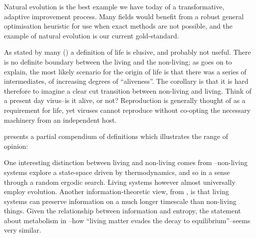 Natural evolution is the best example we have today of a transformative, adaptive improvement process. Many fields would benefit from a robust general optimisation heuristic for use when exact methods are not possible, and the example of natural evolution is our current gold-standard. 

As stated by many (\eg \cite{Pascal2013, Malaterre2015}) a definition of life is elusive, and probably not useful. There is no definite boundary between the living and the non-living; as \parencite{Pascal2013} goes on to explain, the most likely scenario for the origin of life is that there was a series of intermediates, of increasing degrees of ``aliveness''. The corollary is that it is hard therefore to imagine a clear cut transition between non-living and living. Think of a present day virus--is it alive, or not? Reproduction is generally thought of as a requirement for life, yet viruses cannot reproduce without co-opting the necessary machinery from an independent host. 

\parencite{Fernando:2007pf} presents a partial compendium of definitions which illustrates the range of opinion:


One interesting distinction between living and non-living comes from \parencite{Rasmussen2004}--non-living systems explore a state-space driven by thermodynamics, and so in a sense through a random ergodic search. Living systems however almost universally employ evolution. Another information-theoretic view, from \parencite{Adami2015}, is that living systems can preserve information on a much longer timescale than non-living things. Given the relationship between information and entropy, the statement about metabolism in \cite{Schrodinger1944}--how ``living matter evades the decay to equilibrium''--seems very similar.


